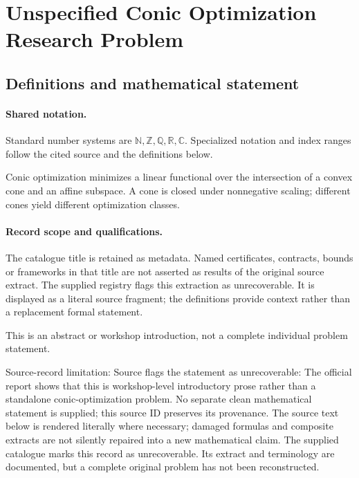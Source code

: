 \documentclass[11pt]{article}
\begin{document}
\section{Unspecified Conic Optimization Research Problem}\label{statement}

\subsection{Definitions and mathematical statement}

\paragraph{Shared notation.}Standard number systems are $\mathbb N,\mathbb Z,\mathbb Q,\mathbb R,\mathbb C$. Specialized notation and index ranges follow the cited source and the definitions below.


Conic optimization minimizes a linear functional over the intersection of a convex cone and an affine subspace. A cone is closed under nonnegative scaling; different cones yield different optimization classes.
\paragraph{Record scope and qualifications.}
The catalogue title is retained as metadata. Named certificates, contracts, bounds or frameworks in that title are not asserted as results of the original source extract.
The supplied registry flags this extraction as unrecoverable. It is displayed as a literal source fragment; the definitions provide context rather than a replacement formal statement.

This is an abstract or workshop introduction, not a complete individual problem statement.

Source-record limitation: Source flags the statement as unrecoverable: The official report shows that this is workshop-level introductory prose rather than a standalone conic-optimization problem. No separate clean mathematical statement is supplied; this source ID preserves its provenance.
The source text below is rendered literally where necessary; damaged formulas and composite extracts are not silently repaired into a new mathematical claim.
The supplied catalogue marks this record as unrecoverable. Its extract and terminology are documented, but a complete original problem has not been reconstructed.
\end{document}
